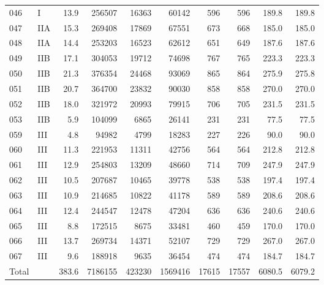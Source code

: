 \begin{table}[H]
\begin{tabular}{llr rrr rr rr}
046 & I & 13.9 & 256507 & 16363 & 60142 & 596 & 596 & 189.8 & 189.8 \\
047 & IIA & 15.3 & 269408 & 17869 & 67551 & 673 & 668 & 185.0 & 185.0 \\
048 & IIA & 14.4 & 253203 & 16523 & 62612 & 651 & 649 & 187.6 & 187.6 \\
049 & IIB & 17.1 & 304053 & 19712 & 74698 & 767 & 765 & 223.3 & 223.3 \\
050 & IIB & 21.3 & 376354 & 24468 & 93069 & 865 & 864 & 275.9 & 275.8 \\
051 & IIB & 20.7 & 364700 & 23832 & 90030 & 858 & 858 & 270.0 & 270.0 \\
052 & IIB & 18.0 & 321972 & 20993 & 79915 & 706 & 705 & 231.5 & 231.5 \\
053 & IIB & 5.9 & 104099 & 6865 & 26141 & 231 & 231 & 77.5 & 77.5 \\
059 & III & 4.8 & 94982 & 4799 & 18283 & 227 & 226 & 90.0 & 90.0 \\
060 & III & 11.3 & 221953 & 11311 & 42756 & 564 & 564 & 212.8 & 212.8 \\
061 & III & 12.9 & 254803 & 13209 & 48660 & 714 & 709 & 247.9 & 247.9 \\
062 & III & 10.5 & 207687 & 10465 & 39778 & 538 & 538 & 197.4 & 197.4 \\
063 & III & 10.9 & 214685 & 10822 & 41178 & 589 & 589 & 208.6 & 208.6 \\
064 & III & 12.4 & 244547 & 12478 & 47204 & 636 & 636 & 240.6 & 240.6 \\
065 & III & 8.8 & 172515 & 8675 & 33481 & 460 & 459 & 170.0 & 170.0 \\
066 & III & 13.7 & 269734 & 14371 & 52107 & 729 & 729 & 267.0 & 267.0 \\
067 & III & 9.6 & 188918 & 9635 & 36454 & 474 & 474 & 184.7 & 184.7 \\
\midrule
Total & & 383.6 & 7186155 & 423230 & 1569416 & 17615 & 17557 & 6080.5 & 6079.2 \\
\bottomrule
\end{tabular}
\end{table}
